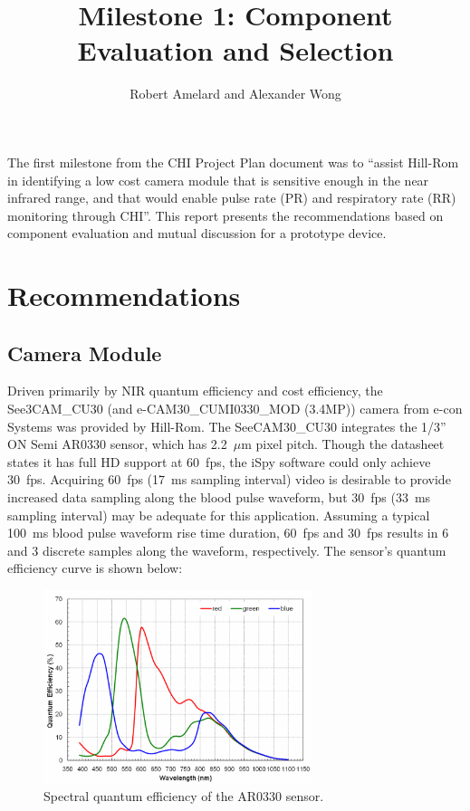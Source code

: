 \documentclass{article}
\begin{document}
\title{Milestone 1: Component Evaluation and Selection}
\author{Robert Amelard and Alexander Wong}
\maketitle

\noindent The first milestone from the CHI Project Plan document was to ``assist Hill-Rom in identifying a low cost camera module that is sensitive enough in the near infrared range, and that would enable pulse rate (PR) and respiratory rate (RR) monitoring through CHI''. This report presents the recommendations based on component evaluation and mutual discussion for a prototype device.

\section{Recommendations}
\subsection{Camera Module}
Driven primarily by NIR quantum efficiency and cost efficiency, the See3CAM\_CU30 (and e-CAM30\_CUMI0330\_MOD (3.4MP)) camera from e-con Systems was provided by Hill-Rom. The SeeCAM30\_CU30 integrates the 1/3'' ON Semi AR0330 sensor, which has 2.2~$\mu$m pixel pitch. Though the datasheet states it has full HD support at 60~fps, the iSpy software could only achieve 30~fps. Acquiring 60~fps (17~ms sampling interval) video is desirable to provide increased data sampling along the blood pulse waveform, but 30~fps (33~ms sampling interval) may be adequate for this application. Assuming a typical 100~ms blood pulse waveform rise time duration, 60~fps and 30~fps results in 6 and 3 discrete samples along the waveform, respectively. The sensor's quantum efficiency curve is shown below:

\begin{figure}[H]
\centering
\includegraphics[width=0.7\textwidth]{QE}
\caption{Spectral quantum efficiency of the AR0330 sensor.}
\end{figure}
\end{document}
